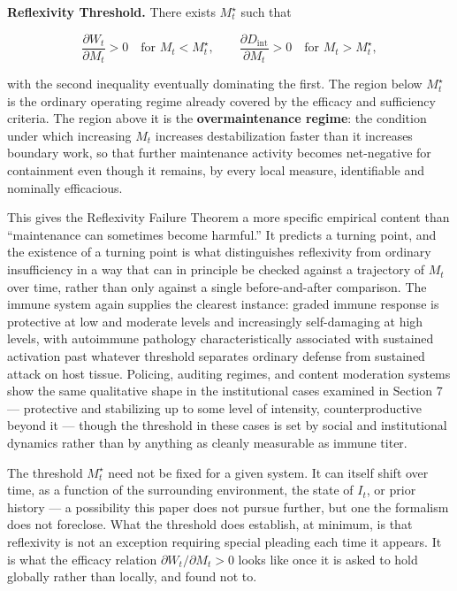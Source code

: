 \documentclass[11pt]{article}
\theoremstyle{plain}
\begin{document}
\textbf{Reflexivity Threshold.} There exists \(M_t^\star\) such that

\[\frac{\partial W_t}{\partial M_t} > 0 \quad \text{for } M_t < M_t^\star, \qquad \frac{\partial D_{\mathrm{int}}}{\partial M_t} > 0 \quad \text{for } M_t > M_t^\star,\]

with the second inequality eventually dominating the first. The region below \(M_t^\star\) is the ordinary operating regime already covered by the efficacy and sufficiency criteria. The region above it is the \textbf{overmaintenance regime}: the condition under which increasing \(M_t\) increases destabilization faster than it increases boundary work, so that further maintenance activity becomes net-negative for containment even though it remains, by every local measure, identifiable and nominally efficacious.

This gives the Reflexivity Failure Theorem a more specific empirical content than ``maintenance can sometimes become harmful.'' It predicts a turning point, and the existence of a turning point is what distinguishes reflexivity from ordinary insufficiency in a way that can in principle be checked against a trajectory of \(M_t\) over time, rather than only against a single before-and-after comparison. The immune system again supplies the clearest instance: graded immune response is protective at low and moderate levels and increasingly self-damaging at high levels, with autoimmune pathology characteristically associated with sustained activation past whatever threshold separates ordinary defense from sustained attack on host tissue. Policing, auditing regimes, and content moderation systems show the same qualitative shape in the institutional cases examined in Section 7 --- protective and stabilizing up to some level of intensity, counterproductive beyond it --- though the threshold in these cases is set by social and institutional dynamics rather than by anything as cleanly measurable as immune titer.

The threshold \(M_t^\star\) need not be fixed for a given system. It can itself shift over time, as a function of the surrounding environment, the state of \(I_t\), or prior history --- a possibility this paper does not pursue further, but one the formalism does not foreclose. What the threshold does establish, at minimum, is that reflexivity is not an exception requiring special pleading each time it appears. It is what the efficacy relation \(\partial W_t/\partial M_t > 0\) looks like once it is asked to hold globally rather than locally, and found not to.
\end{document}
